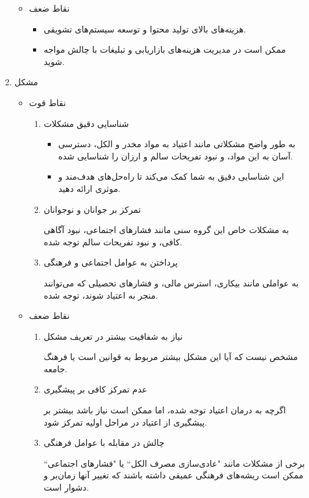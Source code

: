 \documentclass[dvipsnames, svgnames, x11names, 11pt]{article}
\begin{document}
\begin{enumerate}
\begin{itemize}
\item 
نقاط ضعف
\begin{itemize}
\item 
هزینه‌های بالای تولید محتوا و توسعه سیستم‌های تشویقی.
\item 
ممکن است در مدیریت هزینه‌های بازاریابی و تبلیغات با چالش مواجه شوید.
\end{itemize}
\end{itemize}

\item 
مشکل 
\begin{itemize}
\item 
نقاط قوت
\begin{enumerate}
\item 
شناسایی دقیق مشکلات
\begin{itemize}
\item 
به طور واضح مشکلاتی مانند اعتیاد به مواد مخدر و الکل، دسترسی آسان به این مواد، و نبود تفریحات سالم و ارزان را شناسایی شده.
\item 
این شناسایی دقیق به شما کمک می‌کند تا راه‌حل‌های هدف‌مند و موثری ارائه دهید.
\end{itemize}

\item 
تمرکز بر جوانان و نوجوانان

به مشکلات خاص این گروه سنی مانند فشارهای اجتماعی، نبود آگاهی کافی، و نبود تفریحات سالم توجه شده.

\item 
پرداختن به عوامل اجتماعی و فرهنگی

به عواملی مانند بیکاری، استرس مالی، و فشارهای تحصیلی که می‌توانند منجر به اعتیاد شوند، توجه شده.
\end{enumerate}
\item 
نقاط ضعف
\begin{enumerate}
\item 
نیاز به شفافیت بیشتر در تعریف مشکل

مشخص نیست که آیا این مشکل بیشتر مربوط به قوانین است یا فرهنگ جامعه.

\item 
عدم تمرکز کافی بر پیشگیری

اگرچه به درمان اعتیاد توجه شده، اما ممکن است نیاز باشد بیشتر بر پیشگیری از اعتیاد در مراحل اولیه تمرکز شود.

\item 
چالش در مقابله با عوامل فرهنگی

برخی از مشکلات مانند "عادی‌سازی مصرف الکل`` یا "فشارهای اجتماعی`` ممکن است ریشه‌های فرهنگی عمیقی داشته باشند که تغییر آنها زمان‌بر و دشوار است.
\end{enumerate}
\end{itemize}


\end{enumerate}
\end{document}
